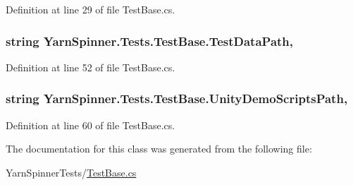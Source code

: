 Definition at line 29 of file Test\-Base.\-cs.

\hypertarget{a00160_aa9b4d902d61adad7165154a265f69aa4}{
\subsubsection[{Test\-Data\-Path}]{\setlength{\rightskip}{0pt plus 5cm}string Yarn\-Spinner.\-Tests.\-Test\-Base.\-Test\-Data\-Path\hspace{0.3cm}{\ttfamily [static]}, {\ttfamily [get]}}}\label{a00160_aa9b4d902d61adad7165154a265f69aa4}


Definition at line 52 of file Test\-Base.\-cs.

\hypertarget{a00160_a39922286f6255e4fd0e433a4fc7521c4}{
\subsubsection[{Unity\-Demo\-Scripts\-Path}]{\setlength{\rightskip}{0pt plus 5cm}string Yarn\-Spinner.\-Tests.\-Test\-Base.\-Unity\-Demo\-Scripts\-Path\hspace{0.3cm}{\ttfamily [static]}, {\ttfamily [get]}}}\label{a00160_a39922286f6255e4fd0e433a4fc7521c4}


Definition at line 60 of file Test\-Base.\-cs.



The documentation for this class was generated from the following file\-:\begin{DoxyCompactItemize}
\item 
Yarn\-Spinner\-Tests/\hyperlink{a00313}{Test\-Base.\-cs}\end{DoxyCompactItemize}
